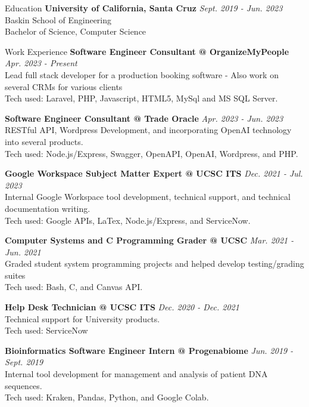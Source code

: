 \documentclass{resume} %
\begin{document}
\begin{rSection}{Education}
    {\bf{University of California, Santa Cruz}}
    \hfill{\em Sept. 2019 - Jun. 2023}
    \\ Baskin School of Engineering
    \\ Bachelor of Science, Computer Science
\end{rSection}

\begin{rSection}{Work Experience}
    {\bf{Software Engineer Consultant} @ OrganizeMyPeople}
    \hfill{\em Apr. 2023 - Present}
    \\ Lead full stack developer for a production booking software - Also work on several CRMs for various clients
    \\ Tech used: Laravel, PHP, Javascript, HTML5, MySql and MS SQL Server.

    {\bf{Software Engineer Consultant} @  Trade Oracle}
    \hfill{\em Apr. 2023 - Jun. 2023}
    \\ RESTful API, Wordpress Development, and incorporating OpenAI technology into several products.
    \\ Tech used: Node.js/Express, Swagger, OpenAPI, OpenAI, Wordpress, and PHP. 

    {\bf{Google Workspace Subject Matter Expert} @ UCSC ITS }
    \hfill{\em Dec. 2021 - Jul. 2023}
    \\ Internal Google Workspace tool development, technical support, and technical documentation writing.
    \\ Tech used: Google APIs, LaTex, Node.js/Express, and ServiceNow.


    {\bf{Computer Systems and C Programming Grader} @ UCSC}
    \hfill{\em Mar. 2021 - Jun. 2021}
    \\ Graded student system programming projects and helped develop testing/grading suites
    \\ Tech used: Bash, C, and Canvas API.

    {\bf{Help Desk Technician} @ UCSC ITS}
    \hfill{\em Dec. 2020 - Dec. 2021}
    \\ Technical support for University products.
    \\ Tech used: ServiceNow

    {\bf{Bioinformatics Software Engineer Intern} @ Progenabiome}
    \hfill{\em Jun. 2019 - Sept. 2019}
    \\ Internal tool development for management and analysis of patient DNA sequences.
    \\ Tech used: Kraken, Pandas, Python, and Google Colab.
\end{rSection}
\end{document}
